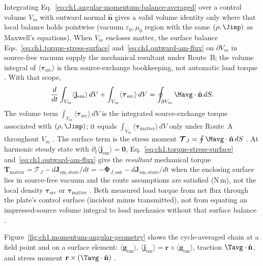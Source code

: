 Integrating Eq.~\eqref{eq:ch1.angular-momentum-balance-averaged} over a control volume $V_m$ with outward normal $\hat{\mathbf{n}}$ gives a valid volume identity only where that local balance holds pointwise (vacuum $\varepsilon_0,\mu_0$ region with the same $(\rho,\Jimp)$ as Maxwell's equations). When $V_m$ encloses matter, the surface balance Eqs.~\eqref{eq:ch1.torque-stress-surface} and~\eqref{eq:ch1.outward-am-flux} on $\partial V_m$ in source-free vacuum supply the mechanical resultant under Route~B; the volume integral of $\langle\boldsymbol{\tau}_{\mathrm{src}}\rangle$ is then source-exchange bookkeeping, not automatic load torque \cite{stratton1941}. With that scope,
\begin{equation}
\label{eq:ch1.angular-balance-integral}
\frac{d}{dt}\int_{V_m} \langle\mathbf{j}_{\mathrm{em}}\rangle\,dV
+\int_{V_m} \langle\boldsymbol{\tau}_{\mathrm{src}}\rangle\,dV
=\oint_{\partial V_m}\Mavg\cdot\hat{\mathbf{n}}\,dS.
\end{equation}
The volume term $\int_{V_m}\langle\boldsymbol{\tau}_{\mathrm{src}}\rangle\,dV$ is the integrated source-exchange torque associated with $(\rho,\Jimp)$; it equals $\int_{V_m}\langle\boldsymbol{\tau}_{\mathrm{matter}}\rangle\,dV$ only under Route~A throughout $V_m$ \cite{stratton1941}. The surface term is the stress moment $\boldsymbol{\mathcal{T}}_J=\oint\Mavg\cdot\hat{\mathbf{n}}\,dS$ \cite{stratton1941}. At harmonic steady state with $\partial_t\langle\mathbf{j}_{\mathrm{em}}\rangle=\mathbf{0}$, Eq.~\eqref{eq:ch1.torque-stress-surface} and~\eqref{eq:ch1.outward-am-flux} give the \emph{resultant} mechanical torque $\mathbf{T}_{\mathrm{matter}}=\boldsymbol{\mathcal{T}}_J-d\mathbf{J}_{\mathrm{em,store}}/dt=-\boldsymbol{\Phi}_{J,\mathrm{out}}-d\mathbf{J}_{\mathrm{em,store}}/dt$ when the enclosing surface lies in source-free vacuum and the route assumptions are satisfied (N\,m), not the local density $\boldsymbol{\tau}_{\mathrm{src}}$ or $\boldsymbol{\tau}_{\mathrm{matter}}$ \cite{beth1936}. Beth \cite{beth1936} measured load torque from net flux through the plate's control surface (incident minus transmitted), not from equating an impressed-source volume integral to load mechanics without that surface balance \cite{stratton1941}.

Figure~\ref{fig:ch1.momentum-angular-geometry} shows the cycle-averaged chain at a field point and on a surface element: $\langle\mathbf{g}_{\mathrm{em}}\rangle$, $\langle\mathbf{j}_{\mathrm{em}}\rangle=\mathbf{r}\times\langle\mathbf{g}_{\mathrm{em}}\rangle$, traction $\Tavg\cdot\hat{\mathbf{n}}$, and stress moment $\mathbf{r}\times(\Tavg\cdot\hat{\mathbf{n}})$ \cite{maxwell1873,beth1936}.

